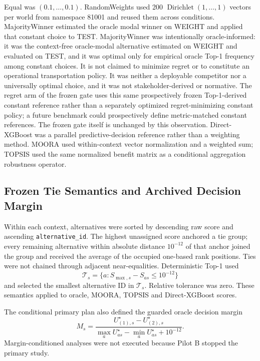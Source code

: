 \documentclass[runningheads,orivec]{llncs}
\begin{document}
Equal was $(0.1,\ldots,0.1)$. RandomWeights used 200
$\operatorname{Dirichlet}(1,\ldots,1)$ vectors per world from namespace 81001 and reused them
across conditions. MajorityWinner estimated the oracle modal winner on WEIGHT and applied that
constant choice to TEST. MajorityWinner was intentionally oracle-informed: it was the
context-free oracle-modal alternative estimated on WEIGHT and evaluated on TEST, and it was
optimal only for empirical oracle Top-1 frequency among constant choices. It is not claimed to
minimize regret or to constitute an operational transportation policy. It was neither a
deployable competitor nor a universally optimal choice, and it was not stakeholder-derived or
normative. The regret arm of the frozen gate uses this same
prospectively frozen Top-1-derived constant reference rather than a separately optimized
regret-minimizing constant policy; a future benchmark could prospectively define metric-matched
constant references. The frozen gate itself is unchanged by this observation. Direct-XGBoost was a parallel
predictive-decision reference rather than a weighting
method. MOORA used within-context vector normalization and a weighted sum; TOPSIS used the same
normalized benefit matrix as a conditional aggregation robustness operator.

\subsection{Frozen Tie Semantics and Archived Decision Margin}

Within each context, alternatives were sorted by descending raw score and ascending
\texttt{alternative\_id}. The highest unassigned score anchored a tie group; every remaining
alternative within absolute distance $10^{-12}$ of that anchor joined the group and received
the average of the occupied one-based rank positions. Ties were not chained through adjacent
near-equalities. Deterministic Top-1 used
\begin{equation}
\mathcal T_s=\{a:S_{\max,s}-S_{as}\le10^{-12}\}
\label{supp:eq:top1tieset}
\end{equation}
and selected the smallest alternative ID in $\mathcal T_s$. Relative tolerance was zero. These
semantics applied to oracle, MOORA, TOPSIS and Direct-XGBoost scores.

The conditional primary plan also defined the guarded oracle decision margin
\begin{equation}
M_s=\frac{U_{(1),s}^\star-U_{(2),s}^\star}
{\max_aU_{as}^\star-\min_aU_{as}^\star+10^{-12}}.
\label{supp:eq:margin}
\end{equation}
Margin-conditioned analyses were not executed because Pilot B stopped the primary study.
\end{document}
